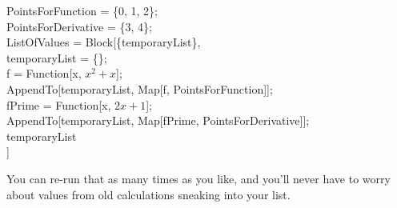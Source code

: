 \begin{code}
	   PointsForFunction = \{0, 1, 2\};\\
	   PointsForDerivative = \{3, 4\};\\
	   ListOfValues = Block[\{temporaryList\},\\
		temporaryList = \{\};\\
		f = Function[x, $x^2 + x$];\\
		AppendTo[temporaryList, Map[f, PointsForFunction]];\\
	   	fPrime = Function[x, $2x + 1$];\\
	   	AppendTo[temporaryList, Map[fPrime, PointsForDerivative]];\\
	   	temporaryList\\
	   ]\\
\end{code}

You can re-run that as many times as you like, and you'll never have to worry about values from old calculations sneaking into your list.
